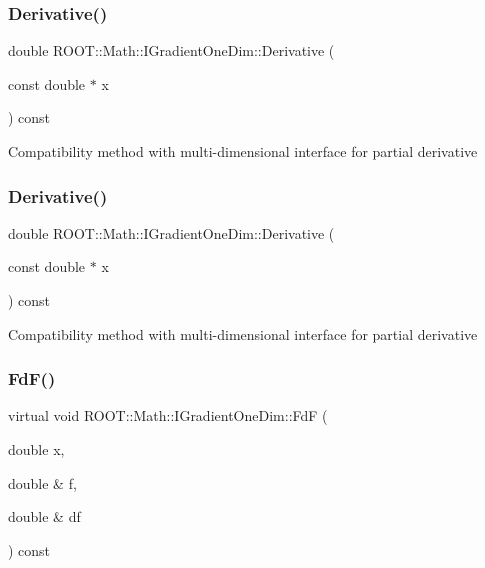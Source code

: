\subsubsection{\texorpdfstring{Derivative()}{Derivative()}\hspace{0.1cm}{\footnotesize\ttfamily [5/6]}}
{\footnotesize\ttfamily double R\+O\+O\+T\+::\+Math\+::\+I\+Gradient\+One\+Dim\+::\+Derivative (\begin{DoxyParamCaption}\item[{const double $\ast$}]{x }\end{DoxyParamCaption}) const\hspace{0.3cm}{\ttfamily [inline]}}

Compatibility method with multi-\/dimensional interface for partial derivative \mbox{\label{classROOT_1_1Math_1_1IGradientOneDim_ab28c444cba126cc1b380d21120dd437f}} 
\subsubsection{\texorpdfstring{Derivative()}{Derivative()}\hspace{0.1cm}{\footnotesize\ttfamily [6/6]}}
{\footnotesize\ttfamily double R\+O\+O\+T\+::\+Math\+::\+I\+Gradient\+One\+Dim\+::\+Derivative (\begin{DoxyParamCaption}\item[{const double $\ast$}]{x }\end{DoxyParamCaption}) const\hspace{0.3cm}{\ttfamily [inline]}}

Compatibility method with multi-\/dimensional interface for partial derivative \mbox{\label{classROOT_1_1Math_1_1IGradientOneDim_aef5560ea7d43e64d94bf875713e2a5fc}} 
\subsubsection{\texorpdfstring{FdF()}{FdF()}\hspace{0.1cm}{\footnotesize\ttfamily [1/6]}}
{\footnotesize\ttfamily virtual void R\+O\+O\+T\+::\+Math\+::\+I\+Gradient\+One\+Dim\+::\+FdF (\begin{DoxyParamCaption}\item[{double}]{x,  }\item[{double \&}]{f,  }\item[{double \&}]{df }\end{DoxyParamCaption}) const\hspace{0.3cm}{\ttfamily [pure virtual]}}

